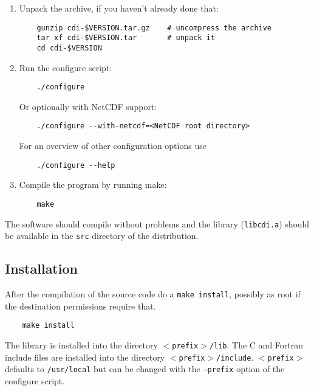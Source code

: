 \begin{enumerate}
\item Unpack the archive, if you haven't already done that:
   
\begin{verbatim}
    gunzip cdi-$VERSION.tar.gz    # uncompress the archive
    tar xf cdi-$VERSION.tar       # unpack it
    cd cdi-$VERSION
\end{verbatim}

\item Run the configure script:
 
\begin{verbatim}
    ./configure
\end{verbatim}

Or optionally with NetCDF support:
 
\begin{verbatim}
    ./configure --with-netcdf=<NetCDF root directory>
\end{verbatim}

For an overview of other configuration options use

\begin{verbatim}
    ./configure --help
\end{verbatim}

\item Compile the program by running make:

\begin{verbatim}
    make
\end{verbatim}

\end{enumerate}

The software should compile without problems and the {\CDI} library (\texttt{libcdi.a}) 
should be available in the \texttt{src} directory of the distribution.


\subsection{Installation}

After the compilation of the source code do a \texttt{make install},
possibly as root if the destination permissions require that.

\begin{verbatim}
    make install
\end{verbatim} 

The library is installed into the directory \texttt{$<$prefix$>$/lib}.
The C and Fortran include files are installed into the directory \texttt{$<$prefix$>$/include}.
\texttt{$<$prefix$>$} defaults to \texttt{/usr/local} but can be changed with 
the \texttt{--prefix} option of the configure script. 


